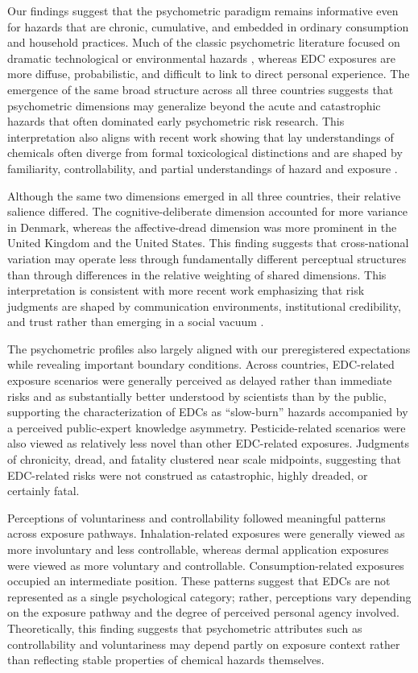Our findings suggest that the psychometric paradigm remains informative even for hazards that are chronic, cumulative, and embedded in ordinary consumption and household practices. Much of the classic psychometric literature focused on dramatic technological or environmental hazards \citep{fischhoff1978safe, slovic1987perception}, whereas EDC exposures are more diffuse, probabilistic, and difficult to link to direct personal experience. The emergence of the same broad structure across all three countries suggests that psychometric dimensions may generalize beyond the acute and catastrophic hazards that often dominated early psychometric risk research. This interpretation also aligns with recent work showing that lay understandings of chemicals often diverge from formal toxicological distinctions and are shaped by familiarity, controllability, and partial understandings of hazard and exposure \citep{bearth2019lay, saleh2019chemophobia}.

Although the same two dimensions emerged in all three countries, their relative salience differed. The cognitive-deliberate dimension accounted for more variance in Denmark, whereas the affective-dread dimension was more prominent in the United Kingdom and the United States. This finding suggests that cross-national variation may operate less through fundamentally different perceptual structures than through differences in the relative weighting of shared dimensions. This interpretation is consistent with more recent work emphasizing that risk judgments are shaped by communication environments, institutional credibility, and trust rather than emerging in a social vacuum \citep{balog2020evolving, kasperson2022social, bearth2022social}.

The psychometric profiles also largely aligned with our preregistered expectations while revealing important boundary conditions. Across countries, EDC-related exposure scenarios were generally perceived as delayed rather than immediate risks and as substantially better understood by scientists than by the public, supporting the characterization of EDCs as “slow-burn” hazards accompanied by a perceived public-expert knowledge asymmetry. Pesticide-related scenarios were also viewed as relatively less novel than other EDC-related exposures. Judgments of chronicity, dread, and fatality clustered near scale midpoints, suggesting that EDC-related risks were not construed as catastrophic, highly dreaded, or certainly fatal.

Perceptions of voluntariness and controllability followed meaningful patterns across exposure pathways. Inhalation-related exposures were generally viewed as more involuntary and less controllable, whereas dermal application exposures were viewed as more voluntary and controllable. Consumption-related exposures occupied an intermediate position. These patterns suggest that EDCs are not represented as a single psychological category; rather, perceptions vary depending on the exposure pathway and the degree of perceived personal agency involved. Theoretically, this finding suggests that psychometric attributes such as controllability and voluntariness may depend partly on exposure context rather than reflecting stable properties of chemical hazards themselves.

